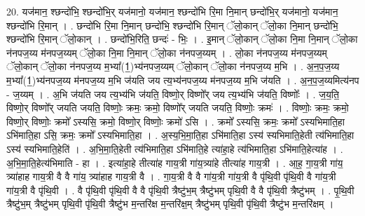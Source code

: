 \documentclass[17pt]{extarticle}
\begin{document}
20. यज॑मान॒ श्छन्दो॑भि॒ श्छन्दो॑भि॒र् यज॑मानो॒ यज॑मान॒ श्छन्दो॑भि रि॒मा नि॒मान् छन्दो॑भि॒र् यज॑मानो॒ यज॑मान॒ श्छन्दो॑भि रि॒मान् । . छन्दो॑भि रि॒मा नि॒मान् छन्दो॑भि॒ श्छन्दो॑भि रि॒मान् ॅलो॒कान् ॅलो॒का नि॒मान् छन्दो॑भि॒ श्छन्दो॑भि रि॒मान् ॅलो॒कान् । . छन्दो॑भि॒रिति॒ छन्दः॑ - भिः॒ । . इ॒मान् ॅलो॒कान् ॅलो॒का नि॒मा नि॒मान् ॅलो॒का न॑नपज॒य्य म॑नपज॒य्यम् ॅलो॒का नि॒मा नि॒मान् ॅलो॒का न॑नपज॒य्यम् । . लो॒का न॑नपज॒य्य म॑नपज॒य्यम् ॅलो॒कान् ॅलो॒का न॑नपज॒य्य म॒भ्या᳚(1॒)भ्य॑नपज॒य्यम् ॅलो॒कान् ॅलो॒का न॑नपज॒य्य म॒भि । . अ॒न॒प॒ज॒य्य म॒भ्या᳚(1॒)भ्य॑नपज॒य्य म॑नपज॒य्य म॒भि ज॑यति जय त्य॒भ्य॑नपज॒य्य म॑नपज॒य्य म॒भि ज॑यति । . अ॒न॒प॒ज॒य्यमित्य॑नप - ज॒य्यम् । . अ॒भि ज॑यति जय त्य॒भ्य॑भि ज॑यति॒ विष्णो॒र् विष्णो᳚र् जय त्य॒भ्य॑भि ज॑यति॒ विष्णोः᳚ । . ज॒य॒ति॒ विष्णो॒र् विष्णो᳚र् जयति जयति॒ विष्णोः॒ क्रमः॒ क्रमो॒ विष्णो᳚र् जयति जयति॒ विष्णोः॒ क्रमः॑ । . विष्णोः॒ क्रमः॒ क्रमो॒ विष्णो॒र् विष्णोः॒ क्रमो᳚ ऽस्यसि॒ क्रमो॒ विष्णो॒र् विष्णोः॒ क्रमो॑ ऽसि । . क्रमो᳚ ऽस्यसि॒ क्रमः॒ क्रमो᳚ ऽस्यभिमाति॒हा ऽभि॑माति॒हा ऽसि॒ क्रमः॒ क्रमो᳚ ऽस्यभिमाति॒हा । . अ॒स्य॒भि॒मा॒ति॒हा ऽभि॑माति॒हा ऽस्य॑ स्यभिमाति॒हेती त्य॑भिमाति॒हा ऽस्य॑ स्यभिमाति॒हेति॑ । . अ॒भि॒मा॒ति॒हेती त्य॑भिमाति॒हा ऽभि॑माति॒हे त्या॑हा॒हे त्य॑भिमाति॒हा ऽभि॑माति॒हेत्या॑ह । . अ॒भि॒मा॒ति॒हेत्य॑भिमाति - हा । . इत्या॑हा॒हे तीत्या॑ह गाय॒त्री गा॑य॒त्र्या॑हे तीत्या॑ह गाय॒त्री । . आ॒ह॒ गा॒य॒त्री गा॑य॒ त्र्या॑हाह गाय॒त्री वै वै गा॑य॒ त्र्या॑हाह गाय॒त्री वै । . गा॒य॒त्री वै वै गा॑य॒त्री गा॑य॒त्री वै पृ॑थि॒वी पृ॑थि॒वी वै गा॑य॒त्री गा॑य॒त्री वै पृ॑थि॒वी । . वै पृ॑थि॒वी पृ॑थि॒वी वै वै पृ॑थि॒वी त्रैष्टु॑भ॒म् त्रैष्टु॑भम् पृथि॒वी वै वै पृ॑थि॒वी त्रैष्टु॑भम् । . पृ॒थि॒वी त्रैष्टु॑भ॒म् त्रैष्टु॑भम् पृथि॒वी पृ॑थि॒वी त्रैष्टु॑भ म॒न्तरि॑क्ष म॒न्तरि॑क्ष॒म् त्रैष्टु॑भम् पृथि॒वी पृ॑थि॒वी त्रैष्टु॑भ म॒न्तरि॑क्षम् । \newline
\end{document}
